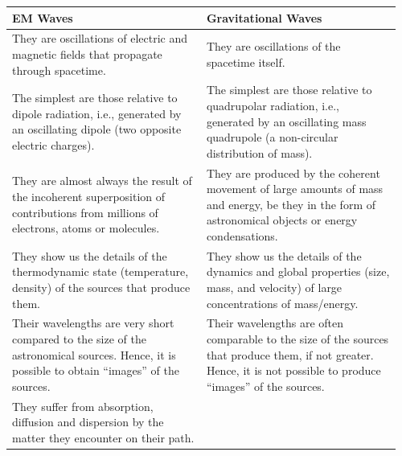 {\small
\setlength{\tabcolsep}{5pt}
\begin{longtable}{@{}>{\raggedright\arraybackslash}p{0.48\linewidth}>{\raggedright\arraybackslash}p{0.48\linewidth}@{}}
\toprule
\textbf{EM Waves}
&
\textbf{Gravitational Waves}
\\[6pt]
\midrule
They are oscillations of electric and magnetic fields that propagate through spacetime.
&
They are oscillations of the spacetime itself.
\\[6pt]
The simplest are those relative to dipole\index{dipole!radiation} radiation, i.e., generated by an oscillating dipole\index{dipole!electric} (two opposite electric charges).
&
The simplest are those relative to quadrupolar radiation\index{quadrupole!radiation}, i.e., generated by an oscillating mass quadrupole\index{quadrupole!mass} (a non-circular distribution of mass).
\\[6pt]
They are almost always the result of the incoherent superposition of contributions from millions of electrons, atoms or molecules.
&
They are produced by the coherent movement of large amounts of mass and energy, be they in the form of astronomical objects or energy condensations.
\\[6pt]
They show us the details of the thermodynamic state\index{thermodynamic state} (temperature, density) of the sources that produce them.
&
They show us the details of the dynamics and global properties (size, mass, and velocity) of large concentrations of mass/energy.
\\[6pt]
Their wavelengths are very short compared to the size of the astronomical sources. Hence, it is possible to obtain ``images'' of the sources.
&
Their wavelengths are often comparable to the size of the sources that produce them, if not greater. Hence, it is not possible to produce ``images'' of the sources.
\\[6pt]
They suffer from absorption, diffusion and dispersion by the matter they encounter on their path.

\end{longtable}}

